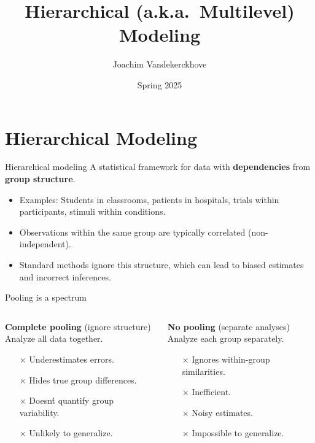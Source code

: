 \documentclass[aspectratio=169]{beamer}
\title{Hierarchical (a.k.a.~Multilevel) Modeling}
\author{Joachim Vandekerckhove}
\date{Spring 2025}
\begin{document}
\maketitle

\section{Hierarchical Modeling}

\begin{frame}{Hierarchical modeling}
    A statistical framework for data with \textbf{dependencies} from \textbf{group structure}.
    \pause
    \begin{itemize}
        \item Examples: Students in classrooms, patients in hospitals, trials within participants, stimuli within conditions.
        \item Observations within the same group are typically correlated (non-independent).
        \item Standard methods ignore this structure, which can lead to biased estimates and incorrect inferences.
    \end{itemize}
\end{frame}

\begin{frame}{Pooling is a spectrum}
    \begin{columns}[T] %
        \begin{column}{0.5\textwidth}
            \textbf{Complete pooling} (ignore structure)\\
            \small Analyze all data together.
            \begin{itemize}
                \item[$\times$] Underestimates errors.
                \item[$\times$] Hides true group differences.
                \item[$\times$] Doesn\'t quantify group variability.
                \item[$\times$] Unlikely to generalize.
            \end{itemize}
        \end{column}
        \begin{column}{0.5\textwidth}
            \textbf{No pooling} (separate analyses)\\
            \small Analyze each group separately.
            \begin{itemize}
                \item[$\times$] Ignores within-group similarities.
                \item[$\times$] Inefficient.
                \item[$\times$] Noisy estimates.
                \item[$\times$] Impossible to generalize.
            \end{itemize}
        \end{column}
    \end{columns}
\end{frame}
\end{document}
